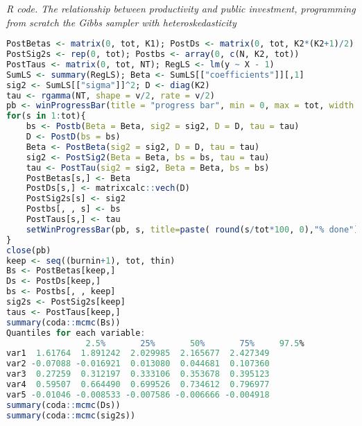 \begin{enumerate}[leftmargin=*]
\begin{tcolorbox}[enhanced,width=4.67in,center upper,
	fontupper=\large\bfseries,drop shadow southwest,sharp corners]
	\textit{R code. The relationship between productivity and public investment, programming from scratch the Gibbs sampler with heteroskedasticity}
	\begin{VF}
		\begin{lstlisting}[language=R]
PostBetas <- matrix(0, tot, K1); PostDs <- matrix(0, tot, K2*(K2+1)/2)
PostSig2s <- rep(0, tot); Postbs <- array(0, c(N, K2, tot))
PostTaus <- matrix(0, tot, NT); RegLS <- lm(y ~ X - 1)
SumLS <- summary(RegLS); Beta <- SumLS[["coefficients"]][,1]
sig2 <- SumLS[["sigma"]]^2; D <- diag(K2)
tau <- rgamma(NT, shape = v/2, rate = v/2) 
pb <- winProgressBar(title = "progress bar", min = 0, max = tot, width = 300)
for(s in 1:tot){
	bs <- Postb(Beta = Beta, sig2 = sig2, D = D, tau = tau)
	D <- PostD(bs = bs)
	Beta <- PostBeta(sig2 = sig2, D = D, tau = tau)
	sig2 <- PostSig2(Beta = Beta, bs = bs, tau = tau)
	tau <- PostTau(sig2 = sig2, Beta = Beta, bs = bs)
	PostBetas[s,] <- Beta
	PostDs[s,] <- matrixcalc::vech(D)
	PostSig2s[s] <- sig2
	Postbs[, , s] <- bs
	PostTaus[s,] <- tau
	setWinProgressBar(pb, s, title=paste( round(s/tot*100, 0),"% done"))
}
close(pb)
keep <- seq((burnin+1), tot, thin)
Bs <- PostBetas[keep,]
Ds <- PostDs[keep,]
bs <- Postbs[, , keep]
sig2s <- PostSig2s[keep]
taus <- PostTaus[keep,]
summary(coda::mcmc(Bs))
Quantiles for each variable:
				2.5%       25%       50%       75%     97.5%
var1  1.61764  1.891242  2.029985  2.165677  2.427349
var2 -0.07088 -0.016921  0.013080  0.044681  0.107360
var3  0.27259  0.312197  0.333106  0.353678  0.395123
var4  0.59507  0.664490  0.699526  0.734612  0.796977
var5 -0.01046 -0.008533 -0.007586 -0.006666 -0.004918
summary(coda::mcmc(Ds))
summary(coda::mcmc(sig2s))\end{lstlisting}
	\end{VF}
\end{tcolorbox}



\end{enumerate}
